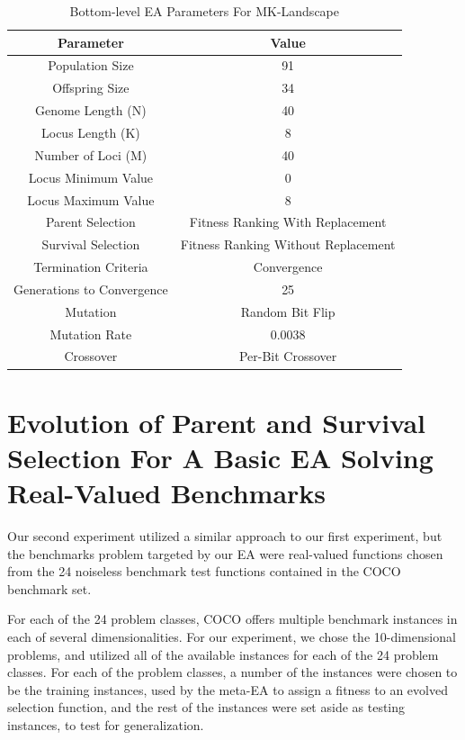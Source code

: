 \documentclass[times,12pt,titlepage]{mstogs}
\begin{document}
\begin{ThesisBody}
\begin{table} 
\centering
  \caption{Bottom-level EA Parameters For MK-Landscape}
  \label{tab:Bottom-level EA Parameters For MK-Landscape}
  \begin{tabular}{c|c}
    \toprule
    Parameter & Value\\
    \midrule
    Population Size & 91 \\
    \hline
    Offspring Size & 34\\
    \hline
    Genome Length (N) & 40 \\
    \hline
    Locus Length (K) & 8\\
    \hline
    Number of Loci (M) & 40 \\
    \hline
    Locus Minimum Value & 0\\
    \hline
    Locus Maximum Value & 8\\
    \hline
    Parent Selection & Fitness Ranking With Replacement \\
    \hline
    Survival Selection & Fitness Ranking Without Replacement \\
    \hline
    Termination Criteria & Convergence \\
    \hline
    Generations to Convergence & 25\\
    \hline
    Mutation & Random Bit Flip \\
    \hline
    Mutation Rate & 0.0038\\
    \hline
    Crossover & Per-Bit Crossover\\
	
  \bottomrule
\end{tabular}
\end{table}

\section{Evolution of Parent and Survival Selection For A Basic EA Solving Real-Valued Benchmarks}
\label{Evolution of Parent and Survival Selection For A Basic EA Solving Real-Valued Benchmarks}

Our second experiment utilized a similar approach to our first experiment, but the benchmarks problem targeted by our EA were real-valued functions chosen from the 24 noiseless benchmark test functions contained in the COCO benchmark set. 

For each of the 24 problem classes, COCO offers multiple benchmark instances in each of several dimensionalities. For our experiment, we chose the 10-dimensional problems, and utilized all of the available instances for each of the 24 problem classes. For each of the problem classes, a number of the instances were chosen to be the training instances, used by the meta-EA to assign a fitness to an evolved selection function, and the rest of the instances were set aside as testing instances, to test for generalization.


\end{ThesisBody}
\end{document}
